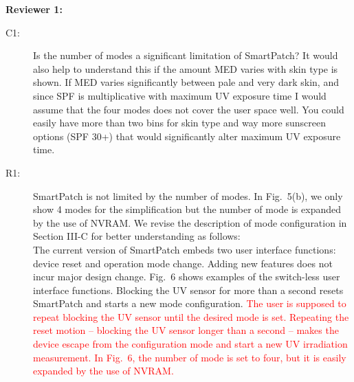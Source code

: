\documentclass[onecolumn]{IEEEconf}
\begin{document}
\setlength{\parindent}{0cm}
\textbf{Reviewer 1:}
\begin{description}
\item [C1: ] Is the number of modes a significant limitation of SmartPatch? It would also help to understand this if the amount MED varies with skin type is shown. If MED varies significantly between pale and very dark skin, and since SPF is multiplicative with maximum UV exposure time I would assume that the four modes does not cover the user space well. You could easily have more than two bins for skin type and way more sunscreen options (SPF 30+) that would significantly alter maximum UV exposure time.  
\item [R1: ] SmartPatch is not limited by the number of modes. In Fig.~5(b), we only show 4 modes for the simplification but the number of mode is expanded by the use of NVRAM. We revise the description of mode configuration in Section
III-C for better understanding as follows:\\

The current version of SmartPatch embeds two user interface functions: device reset and operation mode change. Adding new features does not incur major design change. Fig.~6 shows examples of the switch-less user interface functions. Blocking the UV sensor for more than a second resets SmartPatch and starts a new mode configuration. \textcolor{red}{The user is supposed to repeat blocking the UV sensor until the desired mode is set. Repeating the reset motion -- blocking the UV sensor longer than a second -- makes the device escape from the configuration mode and start a new UV irradiation measurement. In Fig.~6, the number of mode is set to four, but it is easily expanded by the use of NVRAM.}~\\


\end{description}
\end{document}

